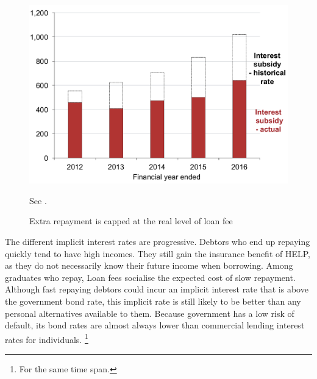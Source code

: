 \documentclass[embargoed]{grattan}
\begin{document}
\begin{figure}
\caption{Extra repayment is capped at the real level of loan fee}\label{fig:fig22-extra-repayment-capped-at-real-level-of-loan-fee}

\includegraphics[page=22]{atlas/Chartpack.pdf}

{See .}
\end{figure}

The different implicit interest rates are progressive.
Debtors who end up repaying quickly tend to have high incomes.
They still gain the insurance benefit of \gls{HELP}, as they do not necessarily know their future income when borrowing.
Among graduates who repay, \gls{Loan fees} socialise the expected cost of slow repayment.
Although fast repaying debtors could incur an implicit interest rate that is above the government bond rate, this implicit rate is still likely to be better than any personal alternatives available to them.
Because government has a low risk of default, its bond rates are almost always lower than commercial lending interest rates for individuals.%
\footnote{For the same time span.}
\end{document}

